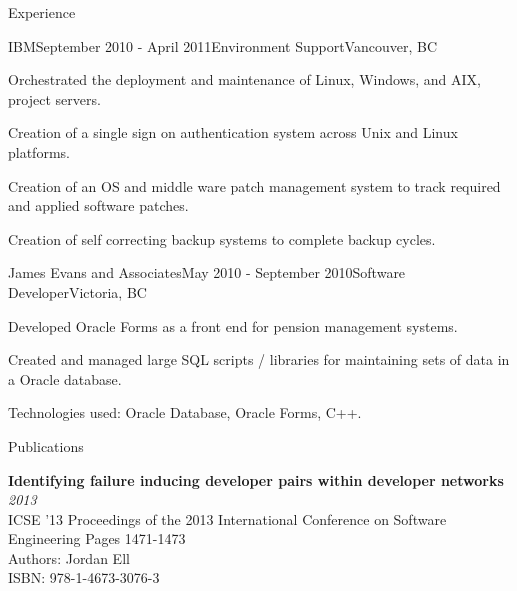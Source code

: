 \documentclass{resume} %
\begin{document}
\begin{rSection}{Experience}

\begin{rSubsection}{IBM}{September 2010 - April 2011}{Environment Support}{Vancouver, BC}
\item Orchestrated the deployment and maintenance of Linux, Windows, and AIX, project servers.
\item Creation of a single sign on authentication system across Unix and Linux platforms.
\item Creation of an OS and middle ware patch management system to track required and applied software patches.
\item Creation of self correcting backup systems to complete backup cycles.
\end{rSubsection}


\begin{rSubsection}{James Evans and Associates}{May 2010 - September 2010}{Software Developer}{Victoria, BC}
\item Developed Oracle Forms as a front end for pension management systems.
\item Created and managed large SQL scripts / libraries for maintaining sets of data in a Oracle database.
\item Technologies used: Oracle Database, Oracle Forms, C++.
\end{rSubsection}

\end{rSection}


\begin{rSection}{Publications}

{\bf Identifying failure inducing developer pairs within developer networks} \hfill {\em2013} \\
ICSE '13 Proceedings of the 2013 International Conference on Software Engineering Pages 1471-1473 \\
Authors: Jordan Ell \\
ISBN: 978-1-4673-3076-3

\end{rSection}

\end{document}
